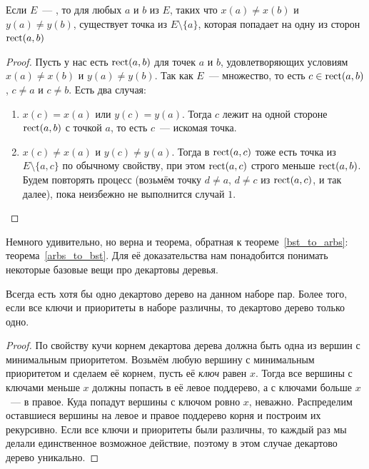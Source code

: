 \begin{lemma}\label{strong_arbs} Если $E$~--- \arbs, то для любых $a$ и $b$ из $E$, таких что $x(a) \neq x(b)$ и $y(a) \neq y(b)$, существует точка из $E \setminus \{a \}$, которая попадает на одну из сторон 
$\operatorname{rect}(a, b)$ 
\end{lemma}
\begin{proof} Пусть у нас есть $\operatorname{rect}(a, b)$ для точек $a$ и $b$, удовлетворяющих 
условиям $x(a) \neq x(b)$ и $y(a) \neq y(b)$. Так как $E$~--- \arbs множество, то есть
$c \in \operatorname{rect}(a, b)$, $c \neq a$ и $c \neq b$. Есть два случая:
\begin{enumerate}
\item $x(c) = x(a)$ или $y(c) = y(a)$. Тогда $c$ лежит на одной стороне $\operatorname{rect}(a, b)$
с точкой $a$, то есть $c$~--- искомая точка.
\item $x(c) \neq x(a)$ и $y(c) \neq y(a)$. Тогда в $\operatorname{rect}(a, c)$ тоже есть точка из $E \setminus \{a, c \}$ по обычному \arbs свойству, при этом $\operatorname{rect}(a, c)$ строго меньше
$\operatorname{rect}(a, b)$. Будем повторять процесс (возьмём точку $d \neq a$, $d \neq c$ из $\operatorname{rect}(a, c)$,
и так далее), пока неизбежно не выполнится случай $1$.
\end{enumerate}
\end{proof}

Немного удивительно, но верна и теорема, обратная к теореме~\ref{bst_to_arbs}:
теорема~\ref{arbs_to_bst}. Для её доказательства нам понадобится понимать
некоторые базовые вещи про декартовы деревья.



\begin{lemma} Всегда есть хотя бы одно декартово дерево на данном наборе пар.
Более того, если все ключи и приоритеты в наборе различны, то
декартово дерево только одно.
\end{lemma}
\begin{proof} По свойству кучи корнем декартова дерева должна быть одна из вершин с минимальным приоритетом. Возьмём любую вершину с минимальным приоритетом и сделаем её корнем, пусть её \emph{ключ} равен $x$. Тогда все вершины с ключами меньше $x$ должны попасть в её левое поддерево, а с ключами больше $x$~--- в правое. Куда попадут вершины с ключом ровно $x$, неважно. Распределим оставшиеся вершины на левое и правое поддерево корня и построим их рекурсивно. Если все ключи и приоритеты были различны, то каждый раз мы делали единственное возможное действие, поэтому в этом случае декартово дерево уникально.
\end{proof}

